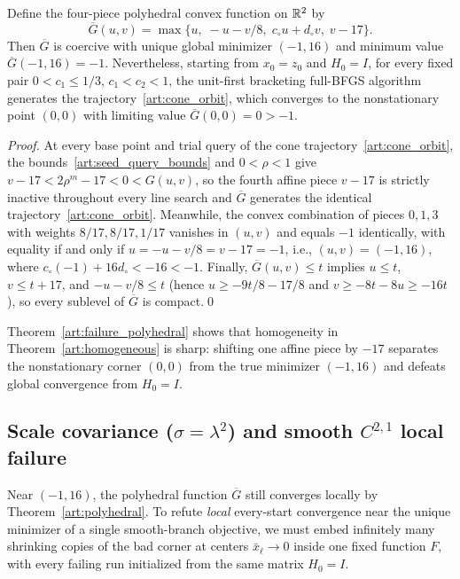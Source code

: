 \begin{theorem}\label{art:failure_polyhedral}
Define the four-piece polyhedral convex function on $\mathbb R^2$ by
\[
 \overline G(u,v)=\max\{u,\;-u-v/8,\;c_\circ u+d_\circ v,\;v-17\}.
\]
Then $\overline G$ is coercive with unique global minimizer $(-1,16)$ and
minimum value $\overline G(-1,16)=-1$. Nevertheless, starting from $x_0=z_0$ and
$H_0=I$, for every fixed pair $0<c_1\le1/3$, $c_1<c_2<1$, the unit-first
bracketing full-BFGS algorithm generates the trajectory~\eqref{art:cone_orbit},
which converges to the nonstationary point $(0,0)$ with limiting value
$\overline G(0,0)=0>-1$.
\end{theorem}
\begin{proof}
At every base point and trial query of the cone trajectory~\eqref{art:cone_orbit},
the bounds~\eqref{art:seed_query_bounds} and $0<\rho<1$ give
$v-17<2\rho^m-17<0<G(u,v)$, so the fourth affine piece $v-17$ is strictly
inactive throughout every line search and $\overline G$ generates the identical
trajectory~\eqref{art:cone_orbit}. Meanwhile, the convex combination of pieces
$0,1,3$ with weights $8/17,8/17,1/17$ vanishes in $(u,v)$ and equals $-1$
identically, with equality if and only if $u=-u-v/8=v-17=-1$, i.e.,
$(u,v)=(-1,16)$, where $c_\circ(-1)+16d_\circ<-16<-1$. Finally, $\overline G(u,v)\le t$
implies $u\le t$, $v\le t+17$, and $-u-v/8\le t$ (hence $u\ge-9t/8-17/8$ and
$v\ge-8t-8u\ge-16t$), so every sublevel of $\overline G$ is compact.\qed
\end{proof}

Theorem~\ref{art:failure_polyhedral} shows that homogeneity in
Theorem~\ref{art:homogeneous} is sharp: shifting one affine piece by $-17$
separates the nonstationary corner $(0,0)$ from the true minimizer $(-1,16)$ and
defeats global convergence from $H_0=I$.

\subsection{Scale covariance ($\sigma=\lambda^2$) and smooth $C^{2,1}$ local failure}

Near $(-1,16)$, the polyhedral function $\overline G$ still converges locally by
Theorem~\ref{art:polyhedral}. To refute \emph{local} every-start convergence near the unique minimizer of a
single smooth-branch objective, we must embed infinitely many shrinking copies
of the bad corner at centers $\bar x_\ell\to0$ inside one fixed function $F$,
with every failing run initialized from the same matrix $H_0=I$.


